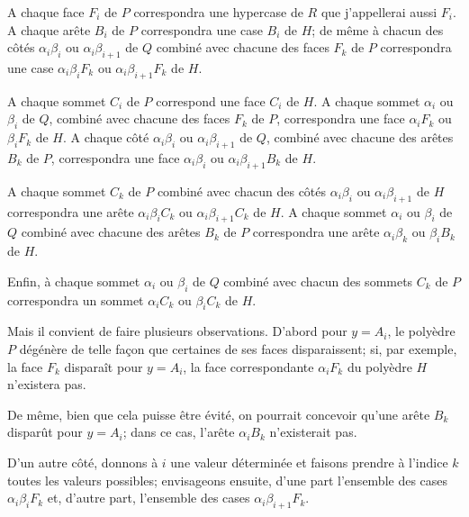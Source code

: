 \documentclass{article}
\begin{document}
A chaque face $F_{i}$ de $P$ correspondra une hypercase de $R$ que j'appellerai aussi $F_{i}$. A chaque arête $B_{i}$ de $P$ correspondra une case $B_{i}$ de $H$; de même à chacun des côtés $\alpha_{i}\beta_{i}$ ou $\alpha_{i}\beta_{i+1}$ de $Q$ combiné avec chacune des faces $F_{k}$ de $P$ correspondra une case $\alpha_{i}\beta_{i}F_{k}$ ou $\alpha_{i}\beta_{i+1}F_{k}$ de $H$.

A chaque sommet $C_{i}$ de $P$ correspond une face $C_{i}$ de $H$. A chaque sommet $\alpha_{i}$ ou $\beta_{i}$ de $Q$, combiné avec chacune des faces $F_{k}$ de $P$, correspondra une face $\alpha_{i}F_{k}$ ou $\beta_{i}F_{k}$ de $H$. A chaque côté $\alpha_{i}\beta_{i}$ ou $\alpha_{i}\beta_{i+1}$ de $Q$, combiné avec chacune des arêtes $B_{k}$ de $P$, correspondra une face $\alpha_{i}\beta_{i}$ ou $\alpha_{i}\beta_{i+1}B_{k}$ de $H$.

A chaque sommet $C_{k}$ de $P$ combiné avec chacun des côtés $\alpha_{i}\beta_{i}$ ou $\alpha_{i}\beta_{i+1}$ de $H$ correspondra une arête $\alpha_{i}\beta_{i}C_{k}$ ou $\alpha_{i}\beta_{i+1}C_{k}$ de $H$. A chaque sommet $\alpha_{i}$ ou $\beta_{i}$ de $Q$ combiné avec chacune des arêtes $B_{k}$ de $P$ correspondra une arête $\alpha_{i}\beta_{k}$ ou $\beta_{i}B_{k}$ de $H$.

Enfin, à chaque sommet $\alpha_{i}$ ou $\beta_{i}$ de $Q$ combiné avec chacun des sommets $C_{k}$ de $P$ correspondra un sommet $\alpha_{i}C_{k}$ ou $\beta_{i}C_{k}$ de $H$.


Mais il convient de faire plusieurs observations. D'abord pour $y = A_{i}$, le polyèdre $P$ dégénère de telle façon que certaines de ses faces disparaissent; si, par exemple, la face $F_{k}$ disparaît pour $y = A_{i}$, la face correspondante $\alpha_{i}F_{k}$ du polyèdre $H$ n'existera pas.

De même, bien que cela puisse être évité, on pourrait concevoir qu'une arête $B_{k}$ disparût pour $y = A_{i}$; dans ce cas, l'arête $\alpha_{i}B_{k}$ n'existerait pas.

D'un autre côté, donnons à $i$ une valeur déterminée et faisons prendre à l'indice $k$ toutes les valeurs possibles; envisageons ensuite, d'une part l'ensemble des cases $\alpha_{i}\beta_{i}F_{k}$ et, d'autre part, l'ensemble des cases $\alpha_{i}\beta_{i+1}F_{k}$.
\end{document}
